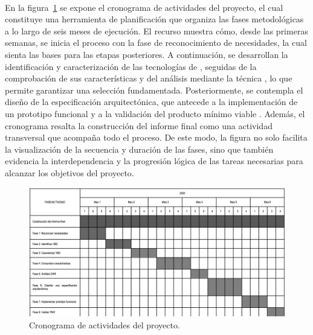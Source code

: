 \label{cap:cronograma}
\mbox{}\\
\noindent
En la figura~\ref{fig:cronograma} se expone el cronograma de actividades del proyecto, el cual constituye una herramienta de planificación que organiza las fases metodológicas a lo largo de seis meses de ejecución. El recurso muestra cómo, desde las primeras semanas, se inicia el proceso con la fase de reconocimiento de necesidades, la cual sienta las bases para las etapas posteriores. A continuación, se desarrollan la identificación y caracterización de las tecnologías de \VBC, seguidas de la comprobación de sus características y del análisis mediante la técnica \DAR, lo que permite garantizar una selección fundamentada. Posteriormente, se contempla el diseño de la especificación arquitectónica, que antecede a la implementación de un prototipo funcional y a la validación del producto mínimo viable \PMV. Además, el cronograma resalta la construcción del informe final como una actividad transversal que acompaña todo el proceso. De este modo, la figura no solo facilita la visualización de la secuencia y duración de las fases, sino que también evidencia la interdependencia y la progresión lógica de las tareas necesarias para alcanzar los objetivos del proyecto.
\begin{figure}[H]
    \centering
    \includegraphics[width=\textwidth]{./tablas-images/cronograma/image.png}
    \caption{Cronograma de actividades del proyecto.}\label{fig:cronograma}
\end{figure}